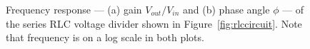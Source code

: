 \documentclass[11pt]{article}
\begin{document}
\begin{figure}[ht]
  \begin{center}
    \hspace{12 pt}
    \caption{Frequency response --- (a) gain $V_{out}/V_{in}$ and (b)
      phase angle $\phi$ --- of the series RLC voltage divider shown in 
      Figure~\ref{fig:rlccircuit}. Note that frequency is on a log scale 
      in both plots.}
    \label{fig:rlcvphi}
  \end{center}
\end{figure}
\end{document}
